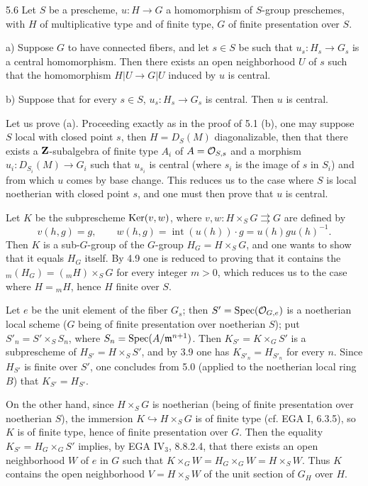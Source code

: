\begin{theorem}{5.6}\label{IX.5.6}
Let $S$ be a prescheme, $u:H\to G$ a homomorphism of $S$-group preschemes, with $H$ of multiplicative type and of finite type, $G$ of finite presentation over $S$.

a) Suppose $G$ to have connected fibers, and let $s\in S$ be such that $u_s:H_s\to G_s$ is a central homomorphism. Then there exists an open neighborhood $U$ of $s$ such that the homomorphism $H|U\to G|U$ induced by $u$ is central.

b) Suppose that for every $s\in S$, $u_s:H_s\to G_s$ is central. Then $u$ is central.
\end{theorem}
 Let us prove (a). Proceeding exactly as in the proof of 5.1 (b), one may suppose $S$ local with closed point $s$, then $H=D_S(M)$ diagonalizable, then that there exists a $\mathbf{Z}$-subalgebra of finite type $A_i$ of $A=\mathcal{O}_{S,s}$ and a morphism $u_i:D_{S_i}(M)\to G_i$ such that $u_{s_i}$ is central (where $s_i$ is the image of $s$ in $S_i$) and from which $u$ comes by base change. This reduces us to the case where $S$ is local noetherian with closed point $s$, and one must then prove that $u$ is central.

Let $K$ be the subprescheme $\operatorname{Ker}(v,w)$, where $v,w:H\times_S G\rightrightarrows G$ are defined by
\[
v(h,g)=g,\qquad w(h,g)=\operatorname{int}(u(h))\cdot g=u(h)g u(h)^{-1}.
\]
Then $K$ is a sub-$G$-group of the $G$-group $H_G=H\times_S G$, and one wants to show that it equals $H_G$ itself. By 4.9 one is reduced to proving that it contains the ${}_m(H_G)=({}_mH)\times_S G$ for every integer $m>0$, which reduces us to the case where $H={}_mH$, hence $H$ finite over $S$.

Let $e$ be the unit element of the fiber $G_s$; then $S'=\operatorname{Spec}(\mathcal{O}_{G,e})$ is a noetherian local scheme ($G$ being of finite presentation over noetherian $S$); put $S'_n=S'\times_S S_n$, where $S_n=\operatorname{Spec}(A/\mathfrak m^{n+1})$. Then $K_{S'}=K\times_G S'$ is a subprescheme of $H_{S'}=H\times_S S'$, and by 3.9 one has $K_{S'_n}=H_{S'_n}$ for every $n$. Since $H_{S'}$ is finite over $S'$, one concludes from 5.0 (applied to the noetherian local ring $B$) that $K_{S'}=H_{S'}$.

On the other hand, since $H\times_S G$ is noetherian (being of finite presentation over noetherian $S$), the immersion $K\hookrightarrow H\times_S G$ is of finite type (cf. EGA I, 6.3.5), so $K$ is of finite type, hence of finite presentation over $G$. Then the equality $K_{S'}=H_G\times_G S'$ implies, by EGA IV$_3$, 8.8.2.4, that there exists an open neighborhood $W$ of $e$ in $G$ such that $K\times_G W=H_G\times_G W=H\times_S W$. Thus $K$ contains the open neighborhood $V=H\times_S W$ of the unit section of $G_H$ over $H$.

